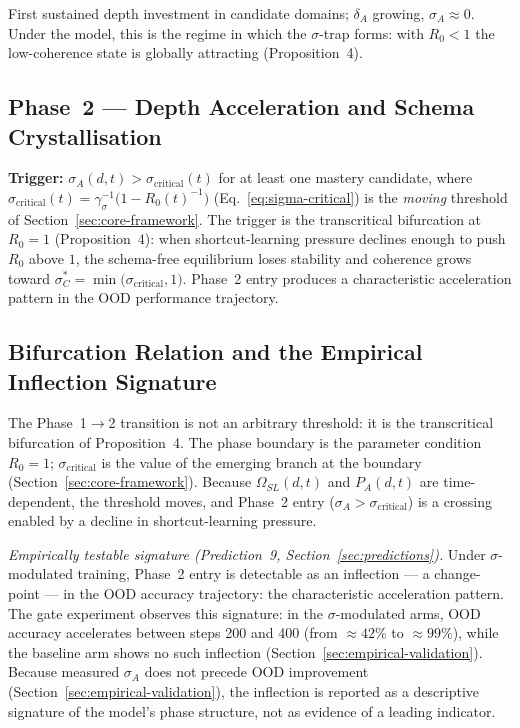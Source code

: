 \documentclass{article}
\theoremstyle{definition}
\begin{document}
First sustained depth investment in candidate domains; $\delta_A$
growing, $\sigma_A \approx 0$. Under the model, this is the regime in
which the $\sigma$-trap forms: with $R_0 < 1$ the low-coherence state
is globally attracting (Proposition~4).

\subsection*{Phase~2 --- Depth Acceleration and Schema Crystallisation}

\textbf{Trigger:} $\sigma_A(d,t) > \sigma_{\text{critical}}(t)$ for at
least one mastery candidate, where
$\sigma_{\text{critical}}(t) = \gamma_\sigma^{-1}\bigl(1 - R_0(t)^{-1}\bigr)$
(Eq.~\eqref{eq:sigma-critical}) is the \emph{moving} threshold of
Section~\ref{sec:core-framework}. The trigger is the transcritical
bifurcation at $R_0 = 1$ (Proposition~4): when
shortcut-learning pressure declines enough to push $R_0$ above $1$, the
schema-free equilibrium loses stability and coherence grows toward
$\sigma_C^* = \min\bigl(\sigma_{\text{critical}}, 1\bigr)$. Phase~2
entry produces a characteristic acceleration pattern in the OOD
performance trajectory.

\subsection{Bifurcation Relation and the Empirical Inflection Signature}\label{sec:bifurcation}

The Phase~1$\to$2 transition is not an arbitrary threshold: it is the
transcritical bifurcation of Proposition~4. The phase boundary is the
parameter condition $R_0 = 1$; $\sigma_{\text{critical}}$ is the value
of the emerging branch at the boundary (Section~\ref{sec:core-framework}).
Because $\Omega_{SL}(d,t)$ and $P_A(d,t)$ are time-dependent, the
threshold moves, and Phase~2 entry ($\sigma_A > \sigma_{\text{critical}}$)
is a crossing enabled by a decline in shortcut-learning pressure.

\noindent\emph{Empirically testable signature (Prediction~9,
Section~\ref{sec:predictions}).} Under $\sigma$-modulated training,
Phase~2 entry is detectable as an inflection --- a change-point --- in
the OOD accuracy trajectory: the characteristic acceleration pattern.
The gate experiment observes this signature: in the $\sigma$-modulated
arms, OOD accuracy accelerates between steps 200 and 400 (from
$\approx 42\%$ to $\approx 99\%$), while the baseline arm shows no such
inflection (Section~\ref{sec:empirical-validation}). Because measured
$\sigma_A$ does not precede OOD improvement
(Section~\ref{sec:empirical-validation}), the inflection is reported as
a descriptive signature of the model's phase structure, not as evidence
of a leading indicator.
\end{document}
